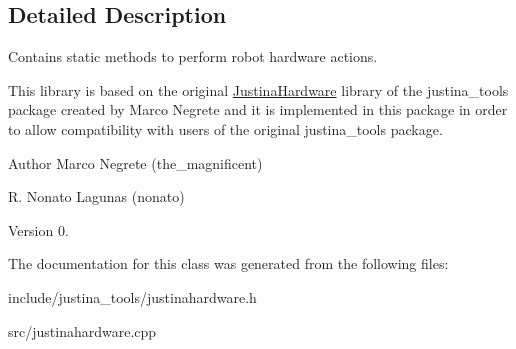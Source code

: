 \subsection{Detailed Description}
Contains static methods to perform robot hardware actions. 

This library is based on the original \hyperlink{class_justina_hardware}{Justina\+Hardware} library of the justina\+\_\+tools package created by Marco Negrete and it is implemented in this package in order to allow compatibility with users of the original justina\+\_\+tools package.

\begin{DoxyAuthor}{Author}
Marco Negrete (the\+\_\+magnificent) 

R. Nonato Lagunas (nonato) 
\end{DoxyAuthor}
\begin{DoxyVersion}{Version}
0. 
\end{DoxyVersion}


The documentation for this class was generated from the following files\+:\begin{DoxyCompactItemize}
\item 
include/justina\+\_\+tools/justinahardware.\+h\item 
src/justinahardware.\+cpp\end{DoxyCompactItemize}
